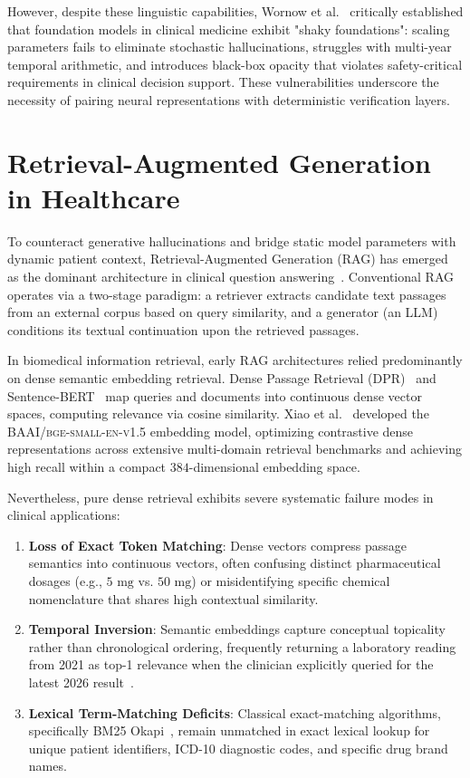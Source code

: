 However, despite these linguistic capabilities, Wornow et al.~\cite{wornow2023shaky} critically established that foundation models in clinical medicine exhibit "shaky foundations": scaling parameters fails to eliminate stochastic hallucinations, struggles with multi-year temporal arithmetic, and introduces black-box opacity that violates safety-critical requirements in clinical decision support. These vulnerabilities underscore the necessity of pairing neural representations with deterministic verification layers.


\section{Retrieval-Augmented Generation in Healthcare}
\label{sec:lit_rag_healthcare}

To counteract generative hallucinations and bridge static model parameters with dynamic patient context, Retrieval-Augmented Generation (RAG) has emerged as the dominant architecture in clinical question answering~\cite{lewis2020rag}. Conventional RAG operates via a two-stage paradigm: a retriever extracts candidate text passages from an external corpus based on query similarity, and a generator (an LLM) conditions its textual continuation upon the retrieved passages.

In biomedical information retrieval, early RAG architectures relied predominantly on dense semantic embedding retrieval. Dense Passage Retrieval (DPR)~\cite{karpukhin2020dpr} and Sentence-BERT~\cite{reimers2019sentencebert} map queries and documents into continuous dense vector spaces, computing relevance via cosine similarity. Xiao et al.~\cite{xiao2023bge} developed the \textsc{BAAI/bge-small-en-v1.5} embedding model, optimizing contrastive dense representations across extensive multi-domain retrieval benchmarks and achieving high recall within a compact $384$-dimensional embedding space.

Nevertheless, pure dense retrieval exhibits severe systematic failure modes in clinical applications:
\begin{enumerate}
    \item \textbf{Loss of Exact Token Matching}: Dense vectors compress passage semantics into continuous vectors, often confusing distinct pharmaceutical dosages (e.g., $5\text{ mg}$ vs. $50\text{ mg}$) or misidentifying specific chemical nomenclature that shares high contextual similarity.
    \item \textbf{Temporal Inversion}: Semantic embeddings capture conceptual topicality rather than chronological ordering, frequently returning a laboratory reading from 2021 as top-1 relevance when the clinician explicitly queried for the latest 2026 result~\cite{gao2023rag_survey}.
    \item \textbf{Lexical Term-Matching Deficits}: Classical exact-matching algorithms, specifically BM25 Okapi~\cite{robertson2009bm25}, remain unmatched in exact lexical lookup for unique patient identifiers, ICD-10 diagnostic codes, and specific drug brand names.
\end{enumerate}


